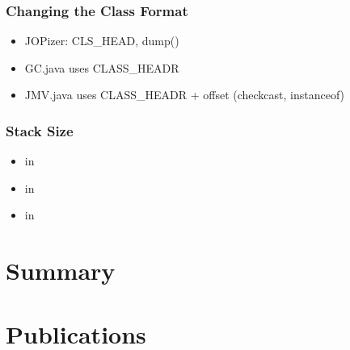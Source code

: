 \subsection{Changing the Class Format}

\begin{itemize}
    \item JOPizer: CLS\_HEAD, dump()
    \item GC.java uses CLASS\_HEADR
    \item JMV.java uses CLASS\_HEADR + offset (checkcast, instanceof)
\end{itemize}

\subsection{Stack Size}

\begin{itemize}
    \item {} in 
    \item {} in 
    \item {} in 
\end{itemize}

\chapter{Summary}
\label{chap:conclusions}

    







\appendix
 \ihead{\leftmark} %

\chapter{Publications}
    

